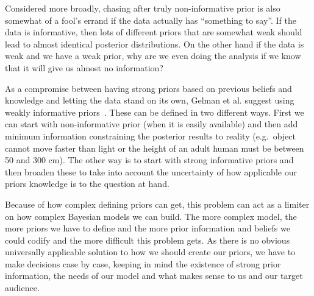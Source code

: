 \documentclass[12pt,a4paper,leqno]{report}
\theoremstyle{plain}
\theoremstyle{definition}
\theoremstyle{remark}
\begin{document}
Considered more broadly, chasing after truly non-informative prior is also
somewhat of a fool's errand if the data actually has ``something to say''.
If the data is informative, then lots of different priors that are somewhat weak
should lead to almost identical posterior distributions. On the other hand if the data is weak and we
have a weak prior, why are we even doing the analysis if we know that it will
give us almost no information?\ \cite{gelman}

As a compromise between having strong priors based on previous beliefs and knowledge and
letting the data stand on its own, Gelman et al.
suggest using weakly informative priors\ \cite{gelman}. These can be defined in two different
ways. First we can start with non-informative prior (when it is easily
available) and then add minimum information constraining the posterior results
to reality (e.g.\ object cannot move faster than light or the height of an adult human
must be between 50 and 300 cm). The other way is to start with strong informative
priors and then broaden these to take into account the uncertainty of
how applicable our priors knowledge is to the question at hand.



\cite{variancepriors}

Because of how complex defining priors can get, this problem can act as a limiter on
how complex Bayesian models we can build. The more complex model, the more priors we
have to define and the more prior information and beliefs we could codify and
the more difficult this problem gets. As there is no obvious universally applicable
solution to how we should create our priors, we have to make decisions case by case,
keeping in mind the existence of strong prior information, the needs of our model and
what makes sense to us and our target audience.

\end{document}
